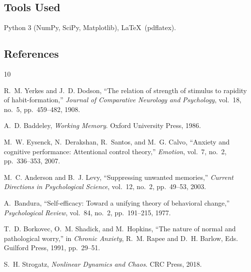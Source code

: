 \documentclass[11pt,a4paper]{article}
\begin{document}
\subsection*{Tools Used}

Python 3 (NumPy, SciPy, Matplotlib), \LaTeX\ (pdflatex).

\subsection*{References}

\begin{thebibliography}{10}

R.~M. Yerkes and J.~D. Dodson,
``The relation of strength of stimulus to rapidity of habit-formation,''
\textit{Journal of Comparative Neurology and Psychology},
vol.~18, no.~5, pp.~459--482, 1908.

A.~D. Baddeley, \textit{Working Memory}.
Oxford University Press, 1986.

M.~W. Eysenck, N.~Derakshan, R.~Santos, and M.~G. Calvo,
``Anxiety and cognitive performance: Attentional control theory,''
\textit{Emotion}, vol.~7, no.~2, pp.~336--353, 2007.

M.~C. Anderson and B.~J. Levy,
``Suppressing unwanted memories,''
\textit{Current Directions in Psychological Science},
vol.~12, no.~2, pp.~49--53, 2003.

A.~Bandura,
``Self-efficacy: Toward a unifying theory of behavioral change,''
\textit{Psychological Review}, vol.~84, no.~2, pp.~191--215, 1977.

T.~D. Borkovec, O.~M. Shadick, and M.~Hopkins,
``The nature of normal and pathological worry,''
in \textit{Chronic Anxiety}, R.~M. Rapee and D.~H. Barlow, Eds.
Guilford Press, 1991, pp.~29--51.

S.~H. Strogatz,
\textit{Nonlinear Dynamics and Chaos}.
CRC Press, 2018.

\end{thebibliography}
\end{document}
